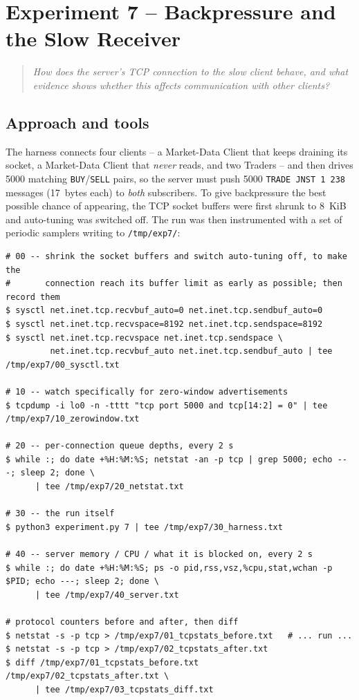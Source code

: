 \documentclass[11pt,a4paper]{article}
\newcommand{\qbox}[1]{%
  \begin{quote}\itshape #1\end{quote}%
}
\begin{document}
\section{Experiment 7 -- Backpressure and the Slow Receiver}

\qbox{How does the server's TCP connection to the slow client behave, and what evidence
shows whether this affects communication with other clients?}

\subsection*{Approach and tools}

The harness connects four clients -- a Market-Data Client that keeps draining its
socket, a Market-Data Client that \emph{never} reads, and two Traders -- and then drives
5000 matching \texttt{BUY}/\texttt{SELL} pairs, so the server must push 5000
\texttt{TRADE JNST 1 238} messages (17~bytes each) to \emph{both} subscribers.  To give
backpressure the best possible chance of appearing, the TCP socket buffers were first
shrunk to 8~KiB and auto-tuning was switched off.  The run was then instrumented with a
set of periodic samplers writing to \texttt{/tmp/exp7/}:

\begin{lstlisting}
# 00 -- shrink the socket buffers and switch auto-tuning off, to make the
#       connection reach its buffer limit as early as possible; then record them
$ sysctl net.inet.tcp.recvbuf_auto=0 net.inet.tcp.sendbuf_auto=0
$ sysctl net.inet.tcp.recvspace=8192 net.inet.tcp.sendspace=8192
$ sysctl net.inet.tcp.recvspace net.inet.tcp.sendspace \
         net.inet.tcp.recvbuf_auto net.inet.tcp.sendbuf_auto | tee /tmp/exp7/00_sysctl.txt

# 10 -- watch specifically for zero-window advertisements
$ tcpdump -i lo0 -n -tttt "tcp port 5000 and tcp[14:2] = 0" | tee /tmp/exp7/10_zerowindow.txt

# 20 -- per-connection queue depths, every 2 s
$ while :; do date +%H:%M:%S; netstat -an -p tcp | grep 5000; echo ---; sleep 2; done \
      | tee /tmp/exp7/20_netstat.txt

# 30 -- the run itself
$ python3 experiment.py 7 | tee /tmp/exp7/30_harness.txt

# 40 -- server memory / CPU / what it is blocked on, every 2 s
$ while :; do date +%H:%M:%S; ps -o pid,rss,vsz,%cpu,stat,wchan -p $PID; echo ---; sleep 2; done \
      | tee /tmp/exp7/40_server.txt

# protocol counters before and after, then diff
$ netstat -s -p tcp > /tmp/exp7/01_tcpstats_before.txt   # ... run ...
$ netstat -s -p tcp > /tmp/exp7/02_tcpstats_after.txt
$ diff /tmp/exp7/01_tcpstats_before.txt /tmp/exp7/02_tcpstats_after.txt \
      | tee /tmp/exp7/03_tcpstats_diff.txt
\end{lstlisting}
\end{document}
